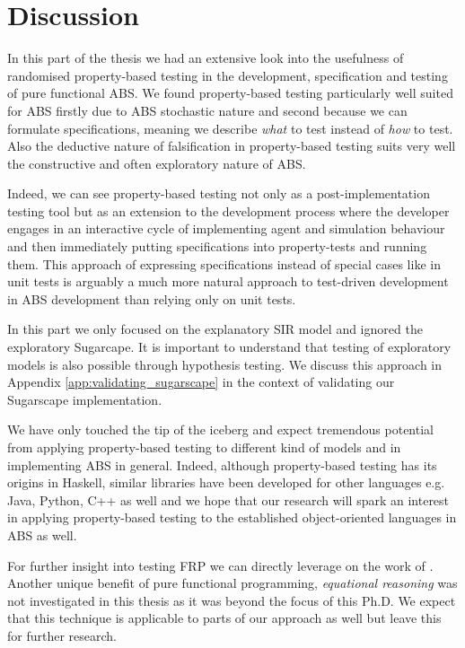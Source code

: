 \chapter*{Discussion}
In this part of the thesis we had an extensive look into the usefulness of randomised property-based testing in the development, specification and testing of pure functional ABS. We found property-based testing particularly well suited for ABS firstly due to ABS stochastic nature and second because we can formulate specifications, meaning we describe \textit{what} to test instead of \textit{how} to test. Also the deductive nature of falsification in property-based testing suits very well the constructive and often exploratory nature of ABS. 

Indeed, we can see property-based testing not only as a post-implementation testing tool but as an extension to the development process where the developer engages in an interactive cycle of implementing agent and simulation behaviour and then immediately putting specifications into property-tests and running them. This approach of expressing specifications instead of special cases like in unit tests is arguably a much more natural approach to test-driven development in ABS development than relying only on unit tests.

In this part we only focused on the explanatory SIR model and ignored the exploratory Sugarcape. It is important to understand that testing of exploratory models is also possible through hypothesis testing. We discuss this approach in Appendix \ref{app:validating_sugarscape} in the context of validating our Sugarscape implementation.

We have only touched the tip of the iceberg and expect tremendous potential from applying property-based testing to different kind of models and in implementing ABS in general. Indeed, although property-based testing has its origins in Haskell, similar libraries have been developed for other languages e.g. Java, Python, C++ as well and we hope that our research will spark an interest in applying property-based testing to the established object-oriented languages in ABS as well.

For further insight into testing FRP we can directly leverage on the work of \cite{perez_testing_2017}. Another unique benefit of pure functional programming, \textit{equational reasoning} was not investigated in this thesis as it was beyond the focus of this Ph.D. We expect that this technique is applicable to parts of our approach as well but leave this for further research.
